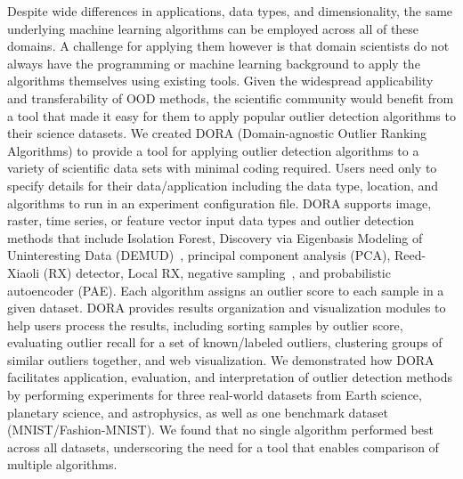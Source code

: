 \documentclass[letterpaper]{article} %
\begin{document}
  Despite wide differences in applications, data types, and dimensionality,
 the same underlying machine learning algorithms can be employed across 
 all of these domains. A challenge for applying them however is that domain
 scientists do not always have the programming or machine learning background
 to apply the algorithms themselves using existing tools. Given the widespread 
 applicability and transferability of OOD methods, the scientific community 
 would benefit from a tool that made it easy for them to apply popular outlier
 detection algorithms to their science datasets. We created DORA 
 (Domain-agnostic Outlier Ranking Algorithms) 
 to provide a tool for applying outlier 
 detection algorithms to a variety of scientific data sets with minimal coding
 required. Users need only to specify details for their data/application 
 including the data type, location, and algorithms to run in an experiment
 configuration file. DORA supports image, raster, time series, 
or feature vector input data types and outlier detection methods that include
 Isolation Forest, Discovery via Eigenbasis Modeling of Uninteresting Data 
 (DEMUD)~\citep{wagstaff:demud13}, principal component analysis (PCA),
   Reed-Xiaoli (RX) detector,  
 Local RX, negative sampling~\cite{sipple:neg-sampling20}, and probabilistic 
 autoencoder (PAE). 
 Each algorithm assigns an outlier 
 score to each sample in a given dataset. 
 DORA provides results organization and visualization 
 modules to help users process the results, including sorting samples by outlier 
 score, evaluating outlier recall for a set of known/labeled outliers, clustering 
 groups of similar outliers together, and web visualization. 
 We demonstrated how DORA
   facilitates application, evaluation, and interpretation of outlier detection
   methods by performing
    experiments for three real-world datasets from Earth science, planetary
  science, and astrophysics, as well as one benchmark dataset 
  (MNIST/Fashion-MNIST). We found that no single algorithm
      performed best across all datasets, underscoring the need for a tool 
      that enables comparison of multiple algorithms.
\end{document}
